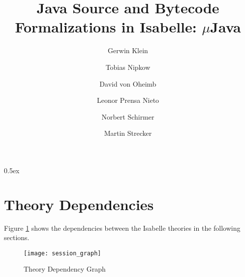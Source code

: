 \documentclass[11pt,a4paper]{book}
\newcommand{\mJava}{$\mu$Java}
\begin{document}
\title{Java Source and Bytecode Formalizations in Isabelle: \mJava\\
}
\author{Gerwin Klein \and Tobias Nipkow \and David von Oheimb \and
  Leonor Prensa Nieto \and Norbert Schirmer \and Martin Strecker}
\maketitle


\tableofcontents
\parindent 0pt \parskip 0.5ex



\section*{Theory Dependencies}

Figure \ref{theory-deps} shows the dependencies between 
the Isabelle theories in the following sections.

\begin{figure}
\begin{center}
  \texttt{[image: session\_graph]}
\end{center}
\caption{Theory Dependency Graph\label{theory-deps}}
\end{figure}

\newpage


\newpage
\nocite{*}


\end{document}
